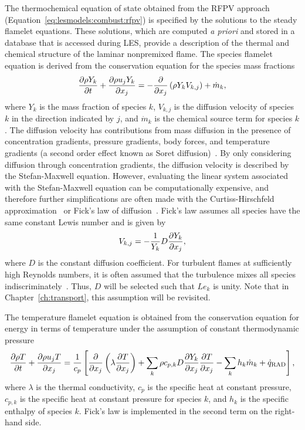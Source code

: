 The thermochemical equation of state obtained from the RFPV approach (Equation~\ref{eq:lesmodels:combust:rfpv}) is specified by the solutions to the steady flamelet equations. These solutions, which are computed \textit{a priori} and stored in a database that is accessed during LES, provide a description of the thermal and chemical structure of the laminar nonpremixed flame. The species flamelet equation is derived from the conservation equation for the species mass fractions
\begin{equation}\label{eq:lesmodels:combust:flamelet:consy}
  \trder{Y_k} = -\pder[]{x_j}\left( \rho Y_k V_{k,j} \right) + \dot{m}_k,
\end{equation}
where $Y_k$ is the mass fraction of species $k$, $V_{k,j}$ is the diffusion velocity of species $k$ in the direction indicated by $j$, and $\dot{m}_k$ is the chemical source term for species $k$. The diffusion velocity has contributions from mass diffusion in the presence of concentration gradients, pressure gradients, body forces, and temperature gradients (a second order effect known as Soret diffusion)~\cite{law2006}. By only considering diffusion through concentration gradients, the diffusion velocity is described by the Stefan-Maxwell equation. However, evaluating the linear system associated with the Stefan-Maxwell equation can be computationally expensive, and therefore further simplifications are often made with the Curtiss-Hirschfeld approximation~\cite{curtiss1949} or Fick's law of diffusion~\cite{fick1855}. Fick's law assumes all species have the same constant Lewis number and is given by
\begin{equation}\label{eq:lesmodels:combust:flamelet:fick}
  V_{k,j} = -\frac{1}{Y_k}D\pder[Y_k]{x_j},
\end{equation}
where $D$ is the constant diffusion coefficient. For turbulent flames at sufficiently high Reynolds numbers, it is often assumed that the turbulence mixes all species indiscriminately~\cite{pitsch19981057}. Thus, $D$ will be selected such that $Le_k$ is unity. Note that in Chapter~\ref{ch:transport}, this assumption will be revisited.

The temperature flamelet equation is obtained from the conservation equation for energy in terms of temperature under the assumption of constant thermodynamic pressure
\begin{equation}\label{eq:lesmodels:combust:flamelet:const}
  \trder{T} = \frac{1}{c_p}\left[ \pder[]{x_j}\left( \lambda\pder[T]{x_j} \right) + \sum\limits_{k} \rho c_{p,k} D\pder[Y_k]{x_j}\pder[T]{x_j} - \sum\limits_{k} h_k\dot{m}_k + \dot{q}_{\text{RAD}} \right],
\end{equation}
where $\lambda$ is the thermal conductivity, $c_p$ is the specific heat at constant pressure, $c_{p,k}$ is the specific heat at constant pressure for species $k$, and $h_k$ is the specific enthalpy of species $k$. Fick's law is implemented in the second term on the right-hand side.

